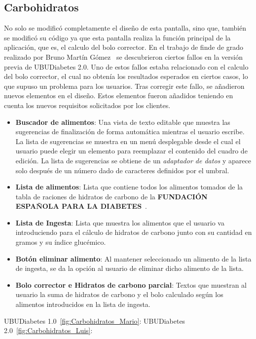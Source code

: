 \subsection{Carbohidratos}
No solo se modificó completamente el diseño de esta pantalla, sino que, también se modificó su código ya que esta pantalla realiza la función principal de la aplicación, que es, el calculo del bolo corrector. En el trabajo de finde de grado realizado por Bruno Martín Gómez~\cite{bruno2017} se descubrieron ciertos fallos en la versión previa de UBUDiabetes 2.0. Uno de estos fallos estaba relacionado con el calculo del bolo corrector, el cual no obtenía los resultados esperados en ciertos casos, lo que supuso un problema para los usuarios. Tras corregir este fallo, se añadieron nuevos elementos en el diseño. Estos elementos fueron añadidos teniendo en cuenta los nuevos requisitos solicitados por los clientes.\\
\begin{itemize}
	\item \textbf{Buscador de alimentos}: Una vista de texto editable que muestra las sugerencias de finalización de forma automática mientras el usuario escribe. La lista de sugerencias se muestra en un menú desplegable desde el cual el usuario puede elegir un elemento para reemplazar el contenido del cuadro de edición. La lista de sugerencias se obtiene de un \textit{adaptador de datos} y aparece solo después de un número dado de caracteres definidos por el umbral.
	\item \textbf{Lista de alimentos}: Lista que contiene todos los alimentos tomados de la tabla de raciones de hidratos de carbono de la \textbf{FUNDACIÓN ESPAÑOLA PARA LA DIABETES}~\cite{tablafe}.
	\item \textbf{Lista de Ingesta}: Lista que muestra los alimentos que el usuario va introduciendo para el cálculo de hidratos de carbono junto con su cantidad en gramos y su índice glucémico. 
	\item \textbf{Botón eliminar alimento}: Al mantener seleccionado un alimento de la lista de ingesta, se da la opción al usuario de eliminar dicho alimento de la lista.
	\item \textbf{Bolo corrector e Hidratos de carbono parcial}: Textos que muestran al usuario la suma de hidratos de carbono y el bolo calculado según los alimentos introducidos en la lista de ingesta.
\end{itemize}
\newpage
UBUDiabetes 1.0~\ref{fig:Carbohidratos_Mario}:
UBUDiabetes 2.0~\ref{fig:Carbohidratos_Luis}:
\newpage
